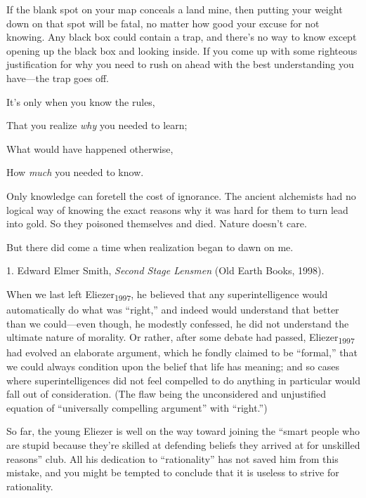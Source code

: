 {
 If the blank spot on your map conceals a land mine, then putting
your weight down on that spot will be fatal, no matter how good your
excuse for not knowing. Any black box could contain a trap, and
there's no way to know except opening up the black box
and looking inside. If you come up with some righteous justification
for why you need to rush on ahead with the best understanding you
have---the trap goes off.}

{
 It's only when you know the rules,}

{
 That you realize \textit{why} you needed to learn;}

{
 What would have happened otherwise,}

{
 How \textit{much} you needed to know.}

{
 Only knowledge can foretell the cost of ignorance. The ancient
alchemists had no logical way of knowing the exact reasons why it was
hard for them to turn lead into gold. So they poisoned themselves and
died. Nature doesn't care.}

{
 But there did come a time when realization began to dawn on me.}

\myendsectiontext


\bigskip

{
 1. Edward Elmer Smith, \textit{Second Stage Lensmen} (Old Earth
Books, 1998).}


{
 When we last left Eliezer\textsubscript{1997}, he believed that
any superintelligence would automatically do what was
``right,'' and indeed would
understand that better than we could---even though, he modestly
confessed, he did not understand the ultimate nature of morality. Or
rather, after some debate had passed, Eliezer\textsubscript{1997} had
evolved an elaborate argument, which he fondly claimed to be
``formal,'' that we could always
condition upon the belief that life has meaning; and so cases where
superintelligences did not feel compelled to do anything in particular
would fall out of consideration. (The flaw being the unconsidered and
unjustified equation of ``universally compelling
argument'' with
``right.'') }

{
 So far, the young Eliezer is well on the way toward joining the
``smart people who are stupid because
they're skilled at defending beliefs they arrived at
for unskilled reasons'' club. All his dedication to
``rationality'' has not saved him
from this mistake, and you might be tempted to conclude that it is
useless to strive for rationality.}


